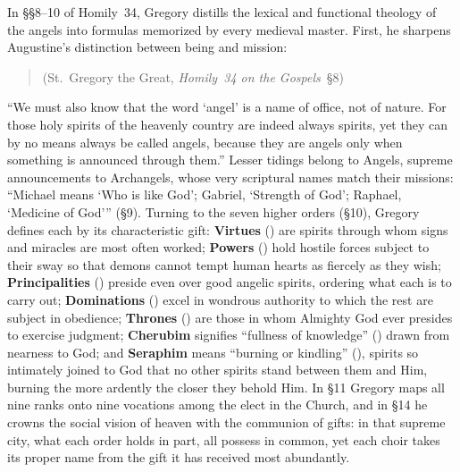 In \S\S 8--10 of Homily~34, Gregory distills the lexical and functional theology of the angels into formulas memorized by every medieval master. First, he sharpens Augustine's distinction between being and mission:
\begin{quotation}
 (St.~Gregory the Great, \emph{Homily~34 on the Gospels}~\S 8)
\end{quotation}
``We must also know that the word `angel' is a name of office, not of nature. For those holy spirits of the heavenly country are indeed always spirits, yet they can by no means always be called angels, because they are angels only when something is announced through them.'' Lesser tidings belong to Angels, supreme announcements to Archangels, whose very scriptural names match their missions: ``Michael means `Who is like God'; Gabriel, `Strength of God'; Raphael, `Medicine of God''' (\S 9). Turning to the seven higher orders (\S 10), Gregory defines each by its characteristic gift: \textbf{Virtues} () are spirits through whom signs and miracles are most often worked; \textbf{Powers} () hold hostile forces subject to their sway so that demons cannot tempt human hearts as fiercely as they wish; \textbf{Principalities} () preside even over good angelic spirits, ordering what each is to carry out; \textbf{Dominations} () excel in wondrous authority to which the rest are subject in obedience; \textbf{Thrones} () are those in whom Almighty God ever presides to exercise judgment; \textbf{Cherubim} signifies ``fullness of knowledge'' () drawn from nearness to God; and \textbf{Seraphim} means ``burning or kindling'' (), spirits so intimately joined to God that no other spirits stand between them and Him, burning the more ardently the closer they behold Him. In \S 11 Gregory maps all nine ranks onto nine vocations among the elect in the Church, and in \S 14 he crowns the social vision of heaven with the communion of gifts: in that supreme city, what each order holds in part, all possess in common, yet each choir takes its proper name from the gift it has received most abundantly.

